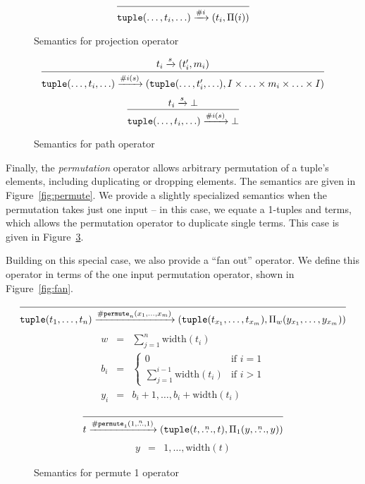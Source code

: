 \begin{figure}[ht]
\[
\infer
  {\mathtt{tuple}(\ldots,t_i,\ldots) \arr{\#i} (t_i,\Pi(i))}
  {}
\]
\caption{Semantics for projection operator}
\label{fig:projection}
\end{figure}

\begin{figure}[ht]
\[
\infer
  {\mathtt{tuple}(\ldots,t_i,\ldots) \arr{\#i(s)} (\mathtt{tuple}(\ldots,t_i',\ldots), I \times \ldots \times m_i \times \ldots \times I)}
  {t_i \arr{s} (t_i',m_i)}
\]
\[
\infer
  {\mathtt{tuple}(\ldots,t_i,\ldots) \arr{\#i(s)} \bot}
  {t_i \arr{s} \bot}
\]
\caption{Semantics for path operator}
\label{fig:path}
\end{figure}

Finally, the \emph{permutation} operator allows arbitrary permutation of a tuple's elements, including duplicating or dropping elements. The semantics are given in Figure~\ref{fig:permute}. We provide a slightly specialized semantics when the permutation takes just one input -- in this case, we equate a 1-tuples and terms, which allows the permutation operator to duplicate single terms. This case is given in Figure~\ref{fig:permute-one}.

Building on this special case, we also provide a ``fan out'' operator. We define this operator in terms of the one input permutation operator, shown in Figure~\ref{fig:fan}.

\begin{figure*}[htb]
\[
\infer
  {\mathtt{tuple}(t_1,\ldots,t_n) \arr{\mathtt{\#permute}_n(x_1,\ldots,x_m)} (\mathtt{tuple}(t_{x_1},\ldots,t_{x_m}),\Pi_w(y_{x_1},\ldots,y_{x_m}))}
  {}
\]
\begin{eqnarray*}
w   &=& \sum_{j=1}^n \mbox{width}(t_i)\\
b_i &=& \left\{
  \begin{array}{cl}
    0 & \mbox{if } i = 1\\
    \sum_{j=1}^{i-1} \mbox{width}(t_i) & \mbox{if } i > 1
  \end{array}
\right.\\
y_i &=& b_i+1,\ldots,b_i + \mbox{width}(t_i)
\end{eqnarray*}
\caption{Semantics for permutation operator}
\label{fig:permute}
\end{figure*}

\begin{figure}[htb]
\[
\infer
  {t \arr{\mathtt{\#permute}_1(1,\overset{n}{\ldots},1)} (\mathtt{tuple}(t,\overset{n}{\ldots},t),\Pi_1(y,\overset{n}{\ldots},y))}
  {}
\]
\begin{eqnarray*}
y &=& 1,\ldots,\mbox{width}(t)
\end{eqnarray*}
\caption{Semantics for permute 1 operator}
\label{fig:permute-one}
\end{figure}


